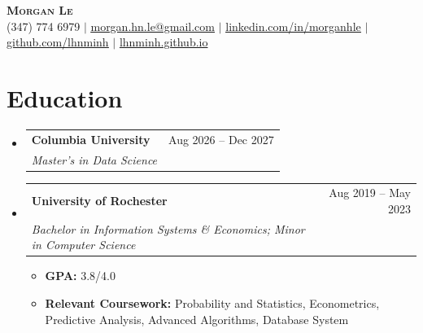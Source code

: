 \documentclass[a4paper,11pt]{article}
\makeatletter
\newcommand{\resumeItem}[1]{
  \item\small{
    {#1 \vspace{-2pt}}
  }
}
\newcommand{\resumeSubheading}[4]{
  \vspace{-2pt}\item
    \begin{tabular*}{0.97\textwidth}[t]{l@{\extracolsep{\fill}}r}
      \textbf{#1} & #2 \\
      \textit{\small#3} & \textit{\small #4} \\
    \end{tabular*}\vspace{-7pt}
}
\newcommand{\resumeSubHeadingListStart}{\begin{itemize}[leftmargin=0.15in, label={}]}
\newcommand{\resumeSubHeadingListEnd}{\end{itemize}}
\newcommand{\resumeItemListStart}{\begin{itemize}}
\newcommand{\resumeItemListEnd}{\end{itemize}\vspace{-5pt}}
\makeatother
\begin{document}
\begin{center}
  \textbf{\Huge \scshape Morgan Le} \\ \vspace{1pt}
  \small (347) 774 6979 $|$
  \href{mailto:morgan.hn.le@gmail.com}{\underline{morgan.hn.le@gmail.com}} $|$
  \href{https://www.linkedin.com/in/morganhle/}{\underline{linkedin.com/in/morganhle}} $|$
  \href{https://github.com/lhnminh}{\underline{github.com/lhnminh}} $|$
  \href{https://lhnminh.github.io/}{lhnminh.github.io}
\end{center}

\section{Education}
\resumeSubHeadingListStart
  \resumeSubheading
    {Columbia University}{Aug 2026 -- Dec 2027}
    {Master's in Data Science}{}
  \resumeSubheading
    {University of Rochester}{Aug 2019 -- May 2023}
    {Bachelor in Information Systems \& Economics; Minor in Computer Science}{}
    \resumeItemListStart
      \resumeItem{{\bfseries GPA:} 3.8/4.0}
      \resumeItem{{\bfseries Relevant Coursework:} Probability and Statistics, Econometrics, Predictive Analysis, Advanced Algorithms, Database System}
    \resumeItemListEnd
\resumeSubHeadingListEnd
\end{document}
